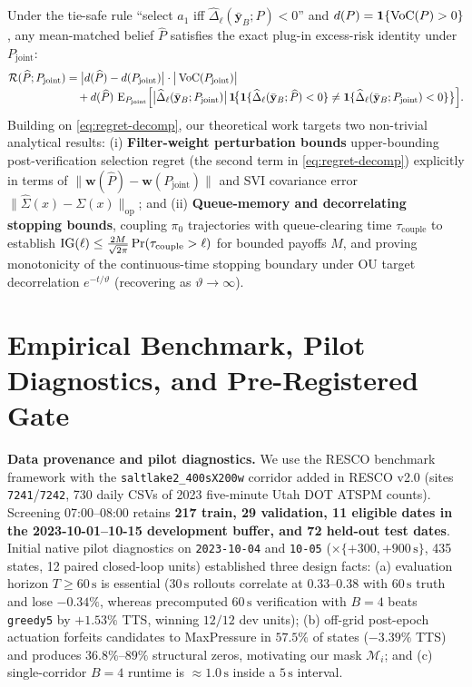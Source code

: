 Under the tie-safe rule ``select $a_1$ iff $\widehat{\Delta}_\ell(\bar{\mathbf{y}}_B; P) < 0$'' and $d(P) = \mathbf{1}\{\operatorname{VoC}(P) > 0\}$, any mean-matched belief $\widehat{P}$ satisfies the exact plug-in excess-risk identity under $P_{\mathrm{joint}}$:
\begin{align}\label{eq:regret-decomp}
\mathcal{R}(\widehat{P}; P_{\mathrm{joint}})
&= \big|d(\widehat{P}) - d(P_{\mathrm{joint}})\big|\cdot\big|\operatorname{VoC}(P_{\mathrm{joint}})\big| \nonumber\\[-2pt]
&\quad + d(\widehat{P})\,\operatorname{E}_{P_{\mathrm{joint}}}\!\Big[\big|\widehat{\Delta}_\ell(\bar{\mathbf{y}}_B; P_{\mathrm{joint}})\big|\,\mathbf{1}\!\big\{\mathbf{1}\{\widehat{\Delta}_\ell(\bar{\mathbf{y}}_B; \widehat{P}) < 0\} \ne \mathbf{1}\{\widehat{\Delta}_\ell(\bar{\mathbf{y}}_B; P_{\mathrm{joint}}) < 0\}\big\}\Big].
\end{align}
Building on \eqref{eq:regret-decomp}, our theoretical work targets two non-trivial analytical results:
(i) \textbf{Filter-weight perturbation bounds} upper-bounding post-verification selection regret (the second term in \eqref{eq:regret-decomp}) explicitly in terms of $\|\mathbf{w}(\widehat{P}) - \mathbf{w}(P_{\mathrm{joint}})\|$ and SVI covariance error $\|\widehat{\Sigma}(x) - \Sigma(x)\|_{\mathrm{op}}$; and
(ii) \textbf{Queue-memory and decorrelating stopping bounds}, coupling $\pi_0$ trajectories with queue-clearing time $\tau_{\mathrm{couple}}$ to establish $\operatorname{IG}(\ell) \le \frac{2M}{\sqrt{2\pi}}\Pr(\tau_{\mathrm{couple}} > \ell)$ for bounded payoffs $M$, and proving monotonicity of the continuous-time stopping boundary under OU target decorrelation $e^{-t/\vartheta}$ (recovering \citealp{chick2012sequential} as $\vartheta \to \infty$).

\section{Empirical Benchmark, Pilot Diagnostics, and Pre-Registered Gate}

\textbf{Data provenance and pilot diagnostics.}
We use the RESCO benchmark framework \citep{ault2021reinforcement} with the \texttt{saltlake2\_400sX200w} corridor added in RESCO v2.0 \citep{resco2025v2} (sites \texttt{7241}/\texttt{7242}, 730 daily CSVs of 2023 five-minute Utah DOT ATSPM counts). Screening 07:00--08:00 retains \textbf{217 train, 29 validation, 11 eligible dates in the 2023-10-01--10-15 development buffer, and 72 held-out test dates}. Initial native pilot diagnostics on \texttt{2023-10-04} and \texttt{10-05} ($\times \{+300, +900\,\mathrm{s}\}$, 435 states, 12 paired closed-loop units) established three design facts: (a) evaluation horizon $T \ge 60\,\mathrm{s}$ is essential ($30\,\mathrm{s}$ rollouts correlate at $0.33$--$0.38$ with $60\,\mathrm{s}$ truth and lose $-0.34\%$, whereas precomputed $60\,\mathrm{s}$ verification with $B=4$ beats \texttt{greedy5} by $+1.53\%$ TTS, winning $12/12$ dev units); (b) off-grid post-epoch actuation forfeits candidates to MaxPressure in $57.5\%$ of states ($-3.39\%$ TTS) and produces $36.8\%$--$89\%$ structural zeros, motivating our mask $\mathcal{M}_i$; and (c) single-corridor $B=4$ runtime is $\approx 1.0\,\mathrm{s}$ inside a $5\,\mathrm{s}$ interval.

